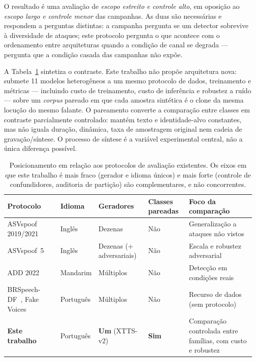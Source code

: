 \documentclass[12pt,a4paper]{article}
\begin{document}
O resultado é uma avaliação de \emph{escopo estreito e controle alto}, em
oposição ao \emph{escopo largo e controle menor} das campanhas. As duas são
necessárias e respondem a perguntas distintas: a campanha pergunta se um
detector sobrevive à diversidade de ataques; este protocolo pergunta o que
acontece com o ordenamento entre arquiteturas quando a condição de canal se
degrada --- pergunta que a condição casada das campanhas não expõe.

A Tabela~\ref{tab:trabalhos_relacionados} sintetiza o contraste. Este trabalho
não propõe arquitetura nova: submete \num{11} modelos heterogêneos a um mesmo
protocolo de dados, treinamento e métricas --- incluindo custo de treinamento,
custo de inferência e robustez a ruído --- sobre um \textit{corpus} pareado em
que cada amostra sintética é o clone da mesma locução do mesmo falante. O
pareamento converte a comparação entre classes em contraste parcialmente
controlado: mantém texto e identidade-alvo constantes, mas não iguala duração,
dinâmica, taxa de amostragem original nem cadeia de gravação/síntese. O processo
de síntese é a variável experimental central, não a única diferença possível.

\begin{table}[H]
	\centering
	\caption[Posicionamento em relação aos protocolos de avaliação existentes.]{Posicionamento em relação aos protocolos de avaliação existentes. Os
		eixos em que este trabalho é mais fraco (gerador e idioma únicos) e mais forte
		(controle de confundidores, auditoria de partição) são complementares, e não
		concorrentes.}
	\label{tab:trabalhos_relacionados}
	\small\singlespacing
	\setlength{\tabcolsep}{3pt}
	\begin{tabular}{@{}>{\raggedright\arraybackslash}p{2.6cm}
			>{\raggedright\arraybackslash}p{2.4cm}
			>{\raggedright\arraybackslash}p{2.2cm}
			>{\raggedright\arraybackslash}p{2.6cm}
			>{\raggedright\arraybackslash}p{3.4cm}@{}}
		\toprule
		\textbf{Protocolo} & \textbf{Idioma} & \textbf{Geradores} &
		\textbf{Classes pareadas} & \textbf{Foco da comparação} \\
		\midrule
		ASVspoof 2019/2021~\cite{todisco2019asvspoof, yamagishi2021asvspoof}
		& Inglês & Dezenas & Não
		& Generalização a ataques não vistos \\
		\addlinespace
		ASVspoof~5~\cite{wang2024asvspoof5}
		& Inglês & Dezenas (+ adversariais) & Não
		& Escala e robustez adversarial \\
		\addlinespace
		ADD 2022~\cite{yi2022add}
		& Mandarim & Múltiplos & Não
		& Detecção em condições reais \\
		\addlinespace
		BRSpeech-DF~\cite{brspeechdf_card}, Fake Voices~\cite{fakevoices_card}
		& Português & Múltiplos & Não
		& Recurso de dados (sem protocolo) \\
		\addlinespace
		\textbf{Este trabalho}
		& Português & \textbf{Um} (XTTS-v2) & \textbf{Sim}
		& Comparação controlada entre famílias, com custo e robustez \\
		\bottomrule
	\end{tabular}
\end{table}
\end{document}
